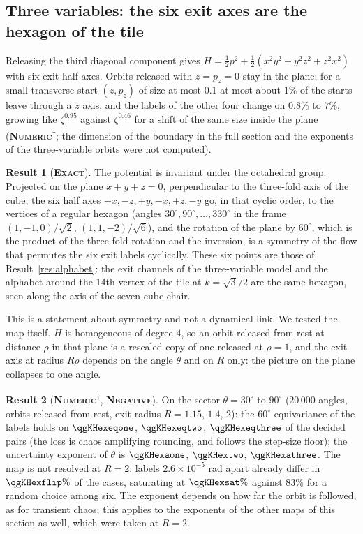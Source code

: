 \documentclass[11pt]{article}
\newcommand{\exact}{\textbf{\textsc{Exact}}}
\newcommand{\numeric}{\textbf{\textsc{Numeric}}}
\newcommand{\negres}{\textbf{\textsc{Negative}}}
\newcommand{\snap}{\textsuperscript{$\dagger$}}      %
\theoremstyle{definition}
\newtheorem{result}{Result}
\begin{document}
\subsection{Three variables: the six exit axes are the hexagon of the tile}\label{sec:ym-three}
Releasing the third diagonal component gives $H=\tfrac12p^2+\tfrac12(x^2y^2+y^2z^2+z^2x^2)$ with six exit half axes. Orbits released with $z=p_z=0$ stay in the plane; for a small transverse start $(z,p_z)$ of size at most $0.1$ at most about $1\%$ of the starts leave through a $z$ axis, and the labels of the other four change on $0.8\%$ to $7\%$, growing like $\zeta^{0.95}$ against $\zeta^{0.46}$ for a shift of the same size inside the plane (\numeric\snap; the dimension of the boundary in the full section and the exponents of the three-variable orbits were not computed).
\begin{result}[\exact]\label{res:ym-hexagon}
The potential is invariant under the octahedral group. Projected on the plane $x+y+z=0$, perpendicular to the three-fold axis of the cube, the six half axes $+x,-z,+y,-x,+z,-y$ go, in that cyclic order, to the vertices of a regular hexagon (angles $30^\circ,90^\circ,\dots,330^\circ$ in the frame $(1,-1,0)/\sqrt2$, $(1,1,-2)/\sqrt6$), and the rotation of the plane by $60^\circ$, which is the product of the three-fold rotation and the inversion, is a symmetry of the flow that permutes the six exit labels cyclically. These six points are those of Result~\ref{res:alphabet}: the exit channels of the three-variable model and the alphabet around the $14$th vertex of the tile at $k=\sqrt3/2$ are the same hexagon, seen along the axis of the seven-cube chair.
\end{result}
This is a statement about symmetry and not a dynamical link. We tested the map itself. $H$ is homogeneous of degree $4$, so an orbit released from rest at distance $\rho$ in that plane is a rescaled copy of one released at $\rho=1$, and the exit axis at radius $R\rho$ depends on the angle $\theta$ and on $R$ only: the picture on the plane collapses to one angle.
\begin{result}[\numeric\snap, \negres]\label{res:ym-theta}
On the sector $\theta=30^\circ$ to $90^\circ$ ($20\,000$ angles, orbits released from rest, exit radius $R=1.15$, $1.4$, $2$): the $60^\circ$ equivariance of the labels holds on $\qgKHexeqone$, $\qgKHexeqtwo$, $\qgKHexeqthree$ of the decided pairs (the loss is chaos amplifying rounding, and follows the step-size floor); the uncertainty exponent of $\theta$ is $\qgKHexaone$, $\qgKHextwo$, $\qgKHexathree$. The map is not resolved at $R=2$: labels $2.6\times10^{-5}$ rad apart already differ in $\qgKHexflip\%$ of the cases, saturating at $\qgKHexsat\%$ against $83\%$ for a random choice among six. The exponent depends on how far the orbit is followed, as for transient chaos; this applies to the exponents of the other maps of this section as well, which were taken at $R=2$.
\end{result}
\end{document}
